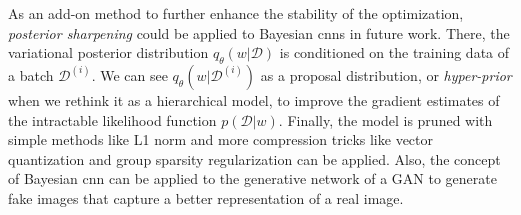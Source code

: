 As an add-on method to further enhance the stability of the optimization, \textit{posterior sharpening} \cite{fortunato2017bayesian} could be applied to Bayesian \acp{cnn} in future work. There, the variational posterior distribution $q_{\theta}(w|\mathcal{D})$ is conditioned on the training data of a batch $\mathcal{D}^{(i)}$. We can see $q_{\theta}(w|\mathcal{D}^{(i)})$ as a proposal distribution, or \textit{hyper-prior} when we rethink it as a hierarchical model, to improve the gradient estimates of the intractable likelihood function $p(\mathcal{D}|w)$. Finally, the model is pruned with simple methods like L1 norm and more compression tricks like vector quantization \cite{DBLP:journals/corr/GongLYB14} and group sparsity regularization  \cite{DBLP:conf/nips/AlvarezS16} can be applied. Also, the concept of Bayesian \ac{cnn} can be applied to the generative network of a GAN to generate fake images that capture a better representation of a real image. 